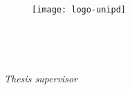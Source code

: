 
\begin{titlepage}

\begin{center}

\begin{LARGE}
\textbf{\myUni}\\
\end{LARGE}

\vspace{5pt}

\begin{Large}
\textsc{\myDepartment}\\
\end{Large}

\vspace{5pt}

\begin{large}
\textsc{\myFaculty}\\
\end{large}

\vspace{30pt}
\begin{figure}[htbp]
\begin{center}
\texttt{[image: logo-unipd]}
\end{center}
\end{figure}

\begin{LARGE}
\begin{center}
\textbf{\myTitle}\\
\end{center}
\end{LARGE}

\vspace{10pt} 

\begin{large}
\textsl{\myDegree}\\
\end{large}

\vspace{20pt} 

\begin{large}
\begin{flushleft}
\textit{Thesis supervisor}\\ 
\vspace{5pt} 
\profTitle \myProf
\end{flushleft}


\end{large}
\end{center}
\end{titlepage}

